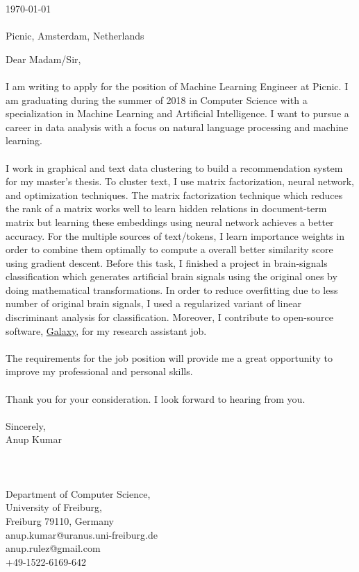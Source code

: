 \documentclass[a4paper]{article}
\begin{document}
\today \\
\\
Picnic, \newline
Amsterdam, \newline
Netherlands \newline

Dear Madam/Sir,
\\
\\
I am writing to apply for the position of Machine Learning Engineer at Picnic. I am graduating during the summer of 2018 in Computer Science with a specialization in Machine Learning and Artificial Intelligence. I want to pursue a career in data analysis with a focus on natural language processing and machine learning.
\\
\\
I work in graphical and text data clustering to build a recommendation system for my master's thesis. To cluster text, I use matrix factorization, neural network, and optimization techniques. The matrix factorization technique which reduces the rank of a matrix works well to learn hidden relations in document-term matrix but learning these embeddings using neural network achieves a better accuracy. For the multiple sources of text/tokens, I learn importance weights in order to combine them optimally to compute a overall better similarity score using gradient descent. Before this task, I finished a project in brain-signals classification which generates artificial brain signals using the original ones by doing mathematical transformations. In order to reduce overfitting due to less number of original brain signals, I used a regularized variant of linear discriminant analysis for classification. Moreover, I contribute to open-source software, 
\href{https://usegalaxy.org/} {Galaxy}, for my research assistant job.
\\
\\
The requirements for the job position will provide me a great opportunity to improve my professional and personal skills.
\\
\\
Thank you for your consideration. I look forward to hearing from you.
\\
\\
Sincerely, \\
Anup Kumar \newline
\\
\\
\\
\\
Department of Computer Science, \\
University of Freiburg, \\
Freiburg 79110, Germany \\
anup.kumar@uranus.uni-freiburg.de\\
anup.rulez@gmail.com\\
+49-1522-6169-642\\
\end{document}
